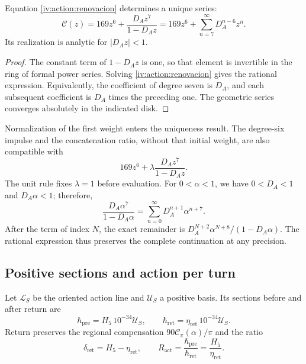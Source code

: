 \begin{proposition}
\label{iv:action:unicidad-renovacion}
Equation \eqref{iv:action:renovacion} determines a unique series:
\begin{equation}
 \mathscr C(z)=169z^6+\frac{D_Az^7}{1-D_Az}
             =169z^6+\sum_{n=7}^{\infty}D_A^{n-6}z^n.
 \label{iv:action:serie-renovacion}
\end{equation}
Its realization is analytic for \(|D_Az|<1\).
\end{proposition}
\begin{proof}
The constant term of \(1-D_Az\) is one, so that
element is invertible in the ring of formal power series.
Solving \eqref{iv:action:renovacion} gives the rational expression.
Equivalently, the coefficient of degree seven is \(D_A\), and each
subsequent coefficient is \(D_A\) times the preceding one. The geometric
series converges absolutely in the indicated disk.
\end{proof}

Normalization of the first weight enters the uniqueness result.
The degree-six impulse and the concatenation ratio, without that
initial weight, are also compatible with
\[
 169z^6+\lambda\frac{D_Az^7}{1-D_Az}.
\]
The unit rule fixes \(\lambda=1\) before evaluation.
For \(0<\alpha<1\), we have \(0<D_A<1\) and \(D_A\alpha<1\);
therefore,
\begin{equation}
 \frac{D_A\alpha^7}{1-D_A\alpha}
   =\sum_{n=0}^{\infty}D_A^{n+1}\alpha^{n+7}.
 \label{iv:action:cola}
\end{equation}
After the term of index \(N\), the exact remainder is
\(D_A^{N+2}\alpha^{N+8}/(1-D_A\alpha)\). The rational expression
thus preserves the complete continuation at any precision.

\subsection{Positive sections and action per turn}
\label{iv:action:secciones}

Let \(\mathcal L_S\) be the oriented action line and
\(\mathcal U_S\) a positive basis. Its sections before and
after return are
\begin{equation}
 \hbar_{\mathrm{pre}}=H_5\,10^{-34}\mathcal U_S,\qquad
 \hbar_{\mathrm{ret}}=\eta_{\mathrm{ret}}\,10^{-34}\mathcal U_S.
 \label{iv:action:hbar}
\end{equation}
Return preserves the regional compensation
\(90\mathcal C_\pi(\alpha)/\pi\) and the ratio
\begin{equation}
 \delta_{\mathrm{ret}}=H_5-\eta_{\mathrm{ret}},\qquad
 R_{\mathrm{act}}=\frac{\hbar_{\mathrm{pre}}}
                        {\hbar_{\mathrm{ret}}}
                =\frac{H_5}{\eta_{\mathrm{ret}}}.
 \label{iv:action:razon}
\end{equation}


